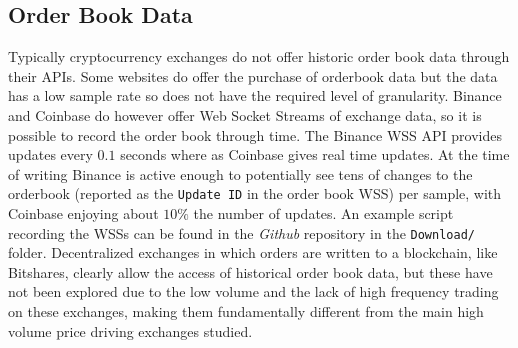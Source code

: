 \documentclass[a4paper,10pt]{article}
\begin{document}
\subsection{Order Book Data}
Typically cryptocurrency exchanges do not offer historic order book data through their APIs. Some websites do offer the purchase of orderbook data but the data has a low sample rate so does not have the required level of granularity. Binance and Coinbase do however offer Web Socket Streams of exchange data, so it is possible to record the order book through time. The Binance WSS API provides updates every $0.1$ seconds \cite{binancewss} where as Coinbase gives real time updates\cite{coinbase}. At the time of writing Binance is active enough to potentially see tens of changes to the orderbook (reported as the \texttt{Update ID} in the order book WSS) per sample, with Coinbase enjoying about $10\%$ the number of updates. An example script recording the WSSs can be found in the \emph{Github} repository in the \texttt{Download/} folder. Decentralized exchanges in which orders are written to a blockchain, like Bitshares, clearly allow the access of historical order book data, but these have not been explored due to the low volume and the lack of high frequency trading on these exchanges, making them fundamentally different from the main high volume price driving exchanges studied\cite{bitshares}. 
\end{document}
